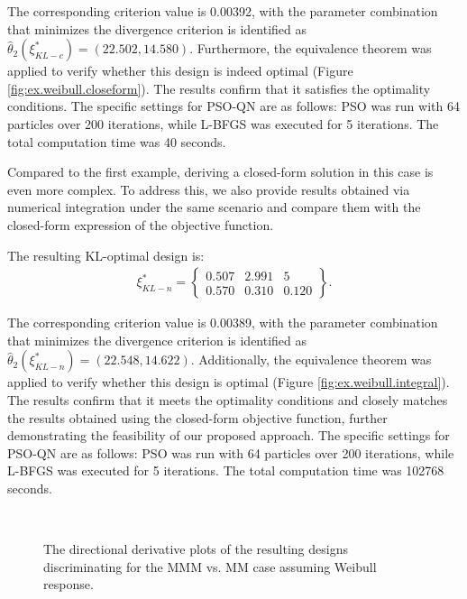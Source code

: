 \hspace*{8mm} The corresponding criterion value is 0.00392, with the parameter combination that minimizes the divergence criterion is identified as $\hat{\theta}_2(\xi^*_{KL-c})=(22.502,14.580)$. Furthermore, the equivalence theorem was applied to verify whether this design is indeed optimal (Figure \ref{fig:ex.weibull.closeform}). The results confirm that it satisfies the optimality conditions. The specific settings for PSO-QN are as follows: PSO was run with 64 particles over 200 iterations, while L-BFGS was executed for 5 iterations. The total computation time was 40 seconds.

\hspace*{8mm} Compared to the first example, deriving a closed-form solution in this case is even more complex. To address this, we also provide results obtained via numerical integration under the same scenario and compare them with the closed-form expression of the objective function.

The resulting KL-optimal design is:
\begin{align*}
\xi^*_{KL-n} = \left\{\begin{array}{ccc}
0.507 & 2.991 & 5 \\
0.570 & 0.310 & 0.120
\end{array}\right\}.
\end{align*}

\hspace*{8mm} The corresponding criterion value is 0.00389, with the parameter combination that minimizes the divergence criterion is identified as $\hat{\theta}_2(\xi^*_{KL-n})=(22.548, 14.622)$. Additionally, the equivalence theorem was applied to verify whether this design is optimal (Figure \ref{fig:ex.weibull.integral}). The results confirm that it meets the optimality conditions and closely matches the results obtained using the closed-form objective function, further demonstrating the feasibility of our proposed approach. The specific settings for PSO-QN are as follows: PSO was run with 64 particles over 200 iterations, while L-BFGS was executed for 5 iterations. The total computation time was 102768 seconds.

\begin{figure}[H]
\centering
{}
 \\
\caption{The directional derivative plots of the resulting designs discriminating for the MMM vs. MM case assuming Weibull response.}
\label{fig:Fidalgo-weibull}
\end{figure}

